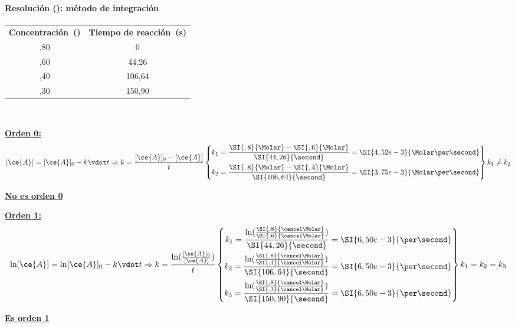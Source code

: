 \begin{frame}
	\frametitle{\ejerciciocmd}
	\framesubtitle{Resolución (): método de integración}
	\begin{center}
		\begin{tabular}{SS}
			{\textbf{Concentración~(\si{\Molar})}}			&
			{\textbf{Tiempo de reacción~(\si{\second})}}	\\
			,80								&	  0			\\
			,60								&	 44,26		\\
			,40								&	106,64		\\
			,30								&	150,90		\\	
		\end{tabular}
	\end{center}
	\\[.2cm]
	\begin{overprint}
			\underline{\textbf{\color{red!50!black}Orden 0:}}
			$$
				[\ce{A}] = [\ce{A}]_0 - k\vdot t\Rightarrow
				k = \frac{[\ce{A}]_0 - [\ce{A}]}{t}\left\{
				\begin{aligned}
					k_1 = \frac{\SI{,8}{\Molar} - \SI{,6}{\Molar}}{\SI{44,26}{\second}}  &= \SI{4,52e-3}{\Molar\per\second}	\\
					k_2 = \frac{\SI{,8}{\Molar} - \SI{,4}{\Molar}}{\SI{106,64}{\second}} &= \SI{3,75e-3}{\Molar\per\second}
				\end{aligned}
				\right\} k_1\neq k_2
			$$
			\begin{center}
				\underline{\textbf{No es orden 0}}
			\end{center}
			\underline{\textbf{\color{red!50!black}Orden 1:}}
			$$
				\ln[\ce{A}] = \ln[\ce{A}]_0 - k\vdot t\Rightarrow
				k = \frac{\ln(\frac{[\ce{A}]_0}{[\ce{A}]})}{t}\left\{
				\begin{aligned}
					k_1 = \frac{\ln(\frac{\SI{,8}{\cancel\Molar}}{\SI{,6}{\cancel\Molar}})}{\SI{44,26}{\second}}  &= \SI{6,50e-3}{\per\second}\\
					k_2 = \frac{\ln(\frac{\SI{,8}{\cancel\Molar}}{\SI{,4}{\cancel\Molar}})}{\SI{106,64}{\second}} &= \SI{6,50e-3}{\per\second}\\
					k_3 = \frac{\ln(\frac{\SI{,8}{\cancel\Molar}}{\SI{,3}{\cancel\Molar}})}{\SI{150,90}{\second}} &= \SI{6,50e-3}{\per\second}
				\end{aligned}
				\right\} k_1 = k_2 = k_3
			$$
			\begin{center}
				\underline{\textbf{Es orden 1}}\qquad{}
			\end{center}
	\end{overprint}
\end{frame}